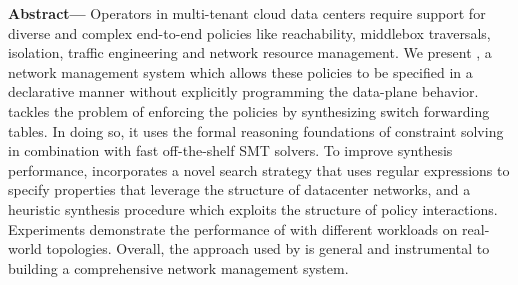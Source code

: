 
  {\bf Abstract---} Operators in multi-tenant cloud data centers require support for
  diverse and complex end-to-end policies like reachability, middlebox
  traversals, isolation, traffic engineering and
   network resource management. We present
  \Name, a network management system which allows these policies to be
  specified in a declarative manner without explicitly programming the
  data-plane behavior.  \name tackles the problem of enforcing the
  policies by synthesizing switch forwarding tables. In doing so, it
  uses the formal reasoning foundations of constraint solving in
  combination with fast off-the-shelf SMT solvers.  To improve
  synthesis performance, \Name incorporates a novel search strategy that
  uses regular expressions to specify properties that leverage the
  structure of datacenter networks,
  and a heuristic synthesis procedure which exploits the structure of
  policy interactions.  Experiments demonstrate the performance of
  \Name with different workloads on real-world topologies. Overall,
  the approach used by \Name is general and instrumental to building a
  comprehensive network management system.

